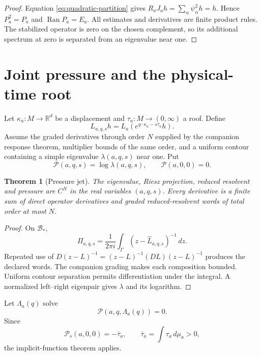 \documentclass[11pt,reqno]{amsart}
\newtheorem{theorem}{Theorem}[section]
\theoremstyle{definition}
\theoremstyle{remark}
\newcommand{\B}{\mathcal B}
\newcommand{\R}{\mathbb R}
\newcommand{\Piop}{\Pi}
\begin{document}
\begin{proof}
Equation \eqref{eq:quadratic-partition} gives
$R_aJ_ah=\sum_\alpha\psi_\alpha^2h=h$.  Hence $P_a^2=P_a$ and
$\operatorname{Ran}P_a=E_a$.  All estimates and derivatives are finite product
rules.  The stabilized operator is zero on the chosen complement, so its
additional spectrum at zero is separated from an eigenvalue near one.
\end{proof}

\section{Joint pressure and the physical-time root}\label{sec:pressure}

Let $\kappa_a:M\to\R^d$ be a displacement and
$\tau_a:M\to(0,\infty)$ a roof.  Define
\begin{equation}\label{eq:joint-twist}
 L_{a,q,s}h=L_a\left(e^{q\cdot\kappa_a-s\tau_a}h\right).
\end{equation}
Assume the graded derivatives through order $N$ supplied by the companion
response theorem, multiplier bounds of the same order, and a uniform contour
containing a simple eigenvalue $\lambda(a,q,s)$ near one.  Put
\[
 \mathscr P(a,q,s)=\log\lambda(a,q,s),
 \qquad \mathscr P(a,0,0)=0.
\]

\begin{theorem}[Pressure jet]\label{thm:pressure}
The eigenvalue, Riesz projection, reduced resolvent and pressure are $C^N$ in
the real variables $(a,q,s)$.  Every derivative is a finite sum of direct
operator derivatives and graded reduced-resolvent words of total order at most
$N$.
\end{theorem}

\begin{proof}
On $\B_*$,
\[
 \Piop_{a,q,s}=\frac1{2\pi i}\int_\Gamma
 (z-\widehat L_{a,q,s})^{-1}\,dz.
\]
Repeated use of
$D(z-L)^{-1}=(z-L)^{-1}(DL)(z-L)^{-1}$ produces the declared words.  The
companion grading makes each composition bounded.  Uniform contour separation
permits differentiation under the integral.  A normalized left--right
eigenpair gives $\lambda$ and its logarithm.
\end{proof}

Let $\Lambda_a(q)$ solve
\begin{equation}\label{eq:root}
 \mathscr P(a,q,\Lambda_a(q))=0.
\end{equation}
Since
\[
 \mathscr P_s(a,0,0)=-\bar\tau_a,
 \qquad \bar\tau_a=\int\tau_a\,d\mu_a>0,
\]
the implicit-function theorem applies.
\end{document}
